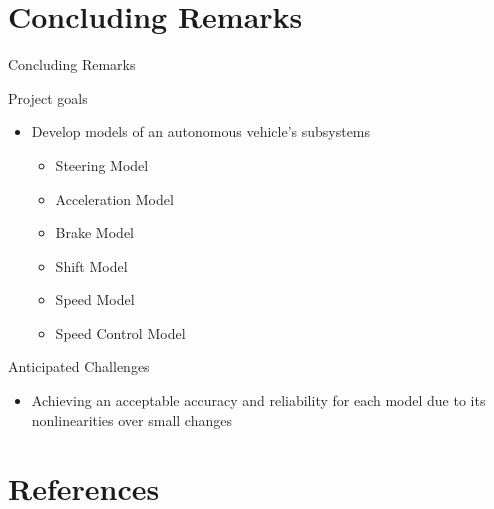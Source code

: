 \documentclass{beamer}
\begin{document}
\section{Concluding Remarks}
\begin{frame}{Concluding Remarks}
  \begin{block}{Project goals}
    \begin{LARGE}
      \begin{itemize}
        \item Develop models of an autonomous vehicle's subsystems
        \begin{itemize}
          \item Steering Model
          \item Acceleration Model
          \item Brake Model
          \item Shift Model
          \item Speed Model
          \item Speed Control Model
        \end{itemize}
      \end{itemize}
    \end{LARGE}
  \end{block}
  \begin{block}{Anticipated Challenges}
    \begin{itemize}
      \item Achieving an acceptable accuracy and reliability for each model due to its nonlinearities over small changes
    \end{itemize}
  \end{block}
\end{frame}


\section{References}
\end{document}
